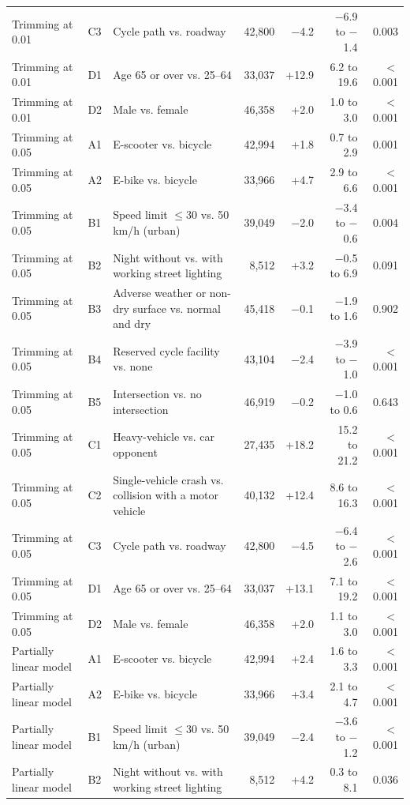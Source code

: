 \begin{table}[tp]
\begin{threeparttable}
{\begin{tabular}{p{4.6cm}lp{4.4cm}rrrr}
Trimming at 0.01 & C3 & Cycle path vs. roadway & 42,800 & $-$4.2 & $-$6.9 to $-$1.4 & 0.003 \\
Trimming at 0.01 & D1 & Age 65 or over vs. 25–64 & 33,037 & +12.9 & 6.2 to 19.6 & $<$0.001 \\
Trimming at 0.01 & D2 & Male vs. female & 46,358 & +2.0 & 1.0 to 3.0 & $<$0.001 \\
Trimming at 0.05 & A1 & E-scooter vs. bicycle & 42,994 & +1.8 & 0.7 to 2.9 & 0.001 \\
Trimming at 0.05 & A2 & E-bike vs. bicycle & 33,966 & +4.7 & 2.9 to 6.6 & $<$0.001 \\
Trimming at 0.05 & B1 & Speed limit $\leq$30 vs. 50 km/h (urban) & 39,049 & $-$2.0 & $-$3.4 to $-$0.6 & 0.004 \\
Trimming at 0.05 & B2 & Night without vs. with working street lighting & 8,512 & +3.2 & $-$0.5 to 6.9 & 0.091 \\
Trimming at 0.05 & B3 & Adverse weather or non-dry surface vs. normal and dry & 45,418 & $-$0.1 & $-$1.9 to 1.6 & 0.902 \\
Trimming at 0.05 & B4 & Reserved cycle facility vs. none & 43,104 & $-$2.4 & $-$3.9 to $-$1.0 & $<$0.001 \\
Trimming at 0.05 & B5 & Intersection vs. no intersection & 46,919 & $-$0.2 & $-$1.0 to 0.6 & 0.643 \\
Trimming at 0.05 & C1 & Heavy-vehicle vs. car opponent & 27,435 & +18.2 & 15.2 to 21.2 & $<$0.001 \\
Trimming at 0.05 & C2 & Single-vehicle crash vs. collision with a motor vehicle & 40,132 & +12.4 & 8.6 to 16.3 & $<$0.001 \\
Trimming at 0.05 & C3 & Cycle path vs. roadway & 42,800 & $-$4.5 & $-$6.4 to $-$2.6 & $<$0.001 \\
Trimming at 0.05 & D1 & Age 65 or over vs. 25–64 & 33,037 & +13.1 & 7.1 to 19.2 & $<$0.001 \\
Trimming at 0.05 & D2 & Male vs. female & 46,358 & +2.0 & 1.1 to 3.0 & $<$0.001 \\
Partially linear model & A1 & E-scooter vs. bicycle & 42,994 & +2.4 & 1.6 to 3.3 & $<$0.001 \\
Partially linear model & A2 & E-bike vs. bicycle & 33,966 & +3.4 & 2.1 to 4.7 & $<$0.001 \\
Partially linear model & B1 & Speed limit $\leq$30 vs. 50 km/h (urban) & 39,049 & $-$2.4 & $-$3.6 to $-$1.2 & $<$0.001 \\
Partially linear model & B2 & Night without vs. with working street lighting & 8,512 & +4.2 & 0.3 to 8.1 & 0.036 \\

\end{tabular}}
\end{threeparttable}
\end{table}
